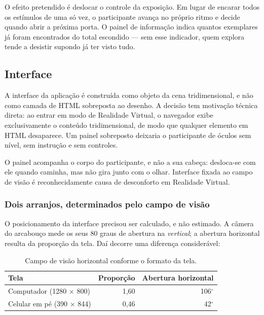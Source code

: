 O efeito pretendido é deslocar o controle da exposição. Em lugar de
encarar todos os estímulos de uma só vez, o participante avança no
próprio ritmo e decide quando abrir a próxima porta. O painel de
informação indica quantos exemplares já foram encontrados do total
escondido --- sem esse indicador, quem explora tende a desistir supondo
já ter visto tudo.

\subsection{Interface}
\label{sec:interface}

A interface da aplicação é construída como objeto da cena
tridimensional, e não como camada de HTML sobreposta ao desenho. A
decisão tem motivação técnica direta: ao entrar em modo de Realidade
Virtual, o navegador exibe exclusivamente o conteúdo tridimensional, de
modo que qualquer elemento em HTML desaparece. Um painel sobreposto
deixaria o participante de óculos sem nível, sem instrução e sem
controles.

O painel acompanha o corpo do participante, e não a sua cabeça:
desloca-se com ele quando caminha, mas não gira junto com o olhar.
Interface fixada ao campo de visão é reconhecidamente causa de
desconforto em Realidade Virtual.

\subsubsection{Dois arranjos, determinados pelo campo de visão}

O posicionamento da interface precisou ser calculado, e não estimado. A
câmera do arcabouço mede os seus 80 graus de abertura na
\emph{vertical}; a abertura horizontal resulta da proporção da tela.
Daí decorre uma diferença considerável:

\begin{table}[htbp]
\centering
\caption{Campo de visão horizontal conforme o formato da tela.}
\label{tab:fov}
\begin{tabular}{lrr}
\toprule
\textbf{Tela} & \textbf{Proporção} & \textbf{Abertura horizontal} \\
\midrule
Computador (1280 $\times$ 800) & 1,60 & 106$^\circ$ \\
Celular em pé (390 $\times$ 844) & 0,46 & 42$^\circ$ \\
\bottomrule
\end{tabular}
\end{table}

